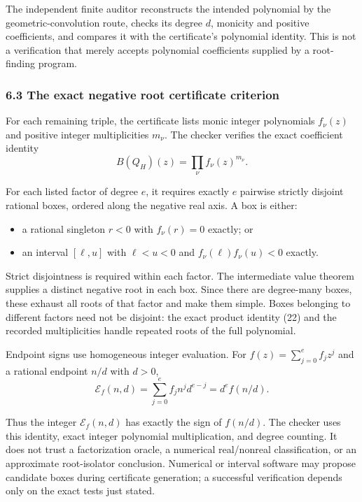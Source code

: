 \documentclass[
  11pt,
  a4paper,
]{article}
\providecommand{\tightlist}{%
  \setlength{\itemsep}{0pt}\setlength{\parskip}{0pt}}
\begin{document}
The independent finite auditor reconstructs the intended polynomial by
the geometric-convolution route, checks its degree \(d\), monicity and
positive coefficients, and compares it with the certificate's polynomial
identity. This is not a verification that merely accepts polynomial
coefficients supplied by a root-finding program.

\subsubsection{6.3 The exact negative root certificate
criterion}\label{the-exact-negative-root-certificate-criterion}

For each remaining triple, the certificate lists monic integer
polynomials \(f_\nu(z)\) and positive integer multiplicities \(m_\nu\).
The checker verifies the exact coefficient identity
\nopagebreak
\[
B(Q_H)(z)=\prod_\nu f_\nu(z)^{m_\nu}.\tag{22}
\]

For each listed factor of degree \(e\), it requires exactly \(e\)
pairwise strictly disjoint rational boxes, ordered along the negative
real axis. A box is either:

\begin{itemize}
\tightlist
\item
  a rational singleton \(r<0\) with \(f_\nu(r)=0\) exactly; or
\item
  an interval \([\ell,u]\) with \(\ell<u<0\) and
  \(f_\nu(\ell)f_\nu(u)<0\) exactly.
\end{itemize}

Strict disjointness is required within each factor. The intermediate
value theorem supplies a distinct negative root in each box. Since there
are degree-many boxes, these exhaust all roots of that factor and make
them simple. Boxes belonging to different factors need not be disjoint:
the exact product identity (22) and the recorded multiplicities handle
repeated roots of the full polynomial.

Endpoint signs use homogeneous integer evaluation. For
\(f(z)=\sum_{j=0}^e f_jz^j\) and a rational endpoint \(n/d\) with
\(d>0\),
\nopagebreak
\[
\mathcal E_f(n,d)=\sum_{j=0}^e f_jn^jd^{e-j}
=d^ef(n/d).\tag{23}
\]

Thus the integer \(\mathcal E_f(n,d)\) has exactly the sign of
\(f(n/d)\). The checker uses this identity, exact integer polynomial
multiplication, and degree counting. It does not trust a factorization
oracle, a numerical real/nonreal classification, or an approximate
root-isolator conclusion. Numerical or interval software may propose
candidate boxes during certificate generation; a successful verification
depends only on the exact tests just stated.
\end{document}
